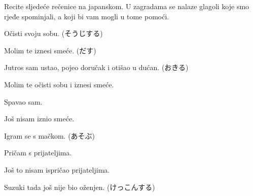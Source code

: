 	\begin{mondai}{Recite sljedeće rečenice na japanskom. U zagradama se nalaze glagoli koje smo rjeđe spominjali, a koji bi vam mogli u tome pomoći.}
		\item Očisti svoju sobu. (そうじする)
		\item Molim te iznesi smeće. (だす)
		\item Jutros sam ustao, pojeo doručak i otišao u dućan. (おきる)
		\item Molim te očisti sobu i iznesi smeće.
		\item Spavao sam.
		\item Još nisam iznio smeće.
		\item Igram se s mačkom. (あそぶ)
		\item Pričam s prijateljima.
		\item Još to nisam ispričao prijateljima.
		\item Suzuki tada još nije bio oženjen. (けっこんする)
	\end{mondai}
